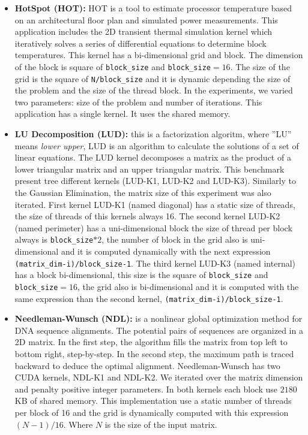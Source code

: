 \begin{itemize}

\item {\bf HotSpot (HOT):}
HOT is a tool to estimate processor temperature based on an architectural floor plan and simulated power measurements. This application includes the 2D transient thermal simulation kernel which iteratively solves a series of differential equations to determine block temperatures. This kernel has a bi-dimensional grid and block. The dimension of the block is square of \texttt{block\_size} and \texttt{block\_size}$ = 16$. The size of the grid is the square of \texttt{N/block\_size} and it is dynamic depending the size of the problem and the size of the thread block. In the experiments, we varied two parameters: size of the problem and number of iterations. This application has a single kernel. It uses the shared memory.



\item {\bf LU Decomposition (LUD):}
this is a factorization algoritm, where ''LU'' means \emph{lower upper}, LUD is an algorithm to calculate the solutions of a set of linear equations. The LUD kernel decomposes a matrix as the product of a lower triangular matrix and an upper triangular matrix. This benchmark present tree different kernels (LUD-K1, LUD-K2 and LUD-K3). Similarly to the Gaussian Elimination, the matrix size of this experiment was also iterated. First kernel LUD-K1 (named diagonal) has a static size of threads, the size of threads of this kernels always 16. The second kernel LUD-K2 (named perimeter) has a uni-dimensional block the size of thread per block always is \texttt{block\_size}$*2$, the number of block in the grid also is uni-dimensional and it is computed dynamically with the next expression \texttt{(matrix\_dim-i)/block\_size-1}. The third kernel LUD-K3 (named internal) has a block bi-dimensional, this size is the square of \texttt{block\_size} and \texttt{block\_size}$ = 16$, the grid also is bi-dimensional and it is computed with the same expression than the second kernel, \texttt{(matrix\_dim-i)/block\_size-1}.


\item {\bf Needleman-Wunsch (NDL):}
is a nonlinear global optimization method for DNA sequence alignments. The potential pairs of sequences are organized in a 2D matrix. In the first step, the algorithm fills the matrix from top left to bottom right, step-by-step. In the second step, the maximum path is traced backward to deduce the optimal alignment. Needleman-Wunsch has two CUDA kernels, NDL-K1 and NDL-K2. We iterated over the matrix dimension and penalty positive integer parameters. In both kernels each block use $2180$ KB of shared memory. This implementation use a static number of threads per block of 16 and the grid is dynamically computed with this expression $(N-1)/16$. Where $N$ is the size of the input matrix. 



\end{itemize}
